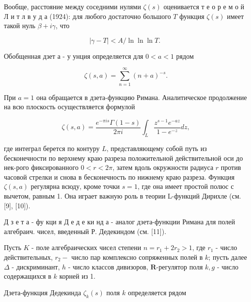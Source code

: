 \documentclass[10pt]{article}
\begin{document}
Вообще, расстояние между соседними нулями $\zeta(s)$ оценивается т е о р е м о й Л и т л в у д а (1924): для любого достаточно большого $T$ функция $\zeta(s)$ имеет такой нуль $\beta+i \gamma$, что



\[

|\gamma-T|<A / \ln \ln \ln T \text {. }

\]



Обобщенная дзет а - у унция определяется для $0<a<1$ рядом



\[

\zeta(s, a)=\sum_{n=1}^{\infty}(n+a)^{-s} .

\]



При $a=1$ она обращается в дзета-функцию Римана. Аналитическое продолжение на всю плоскость осуществляется формулой



\[

\zeta(s, a)=\frac{e^{-\pi i s} \Gamma(1-s)}{2 \pi i} \int_{L} \frac{z^{s-1} e^{-a z}}{1-e^{-z}} d z,

\]



где интеграл берется по контуру $L$, представляющему собой путь из бесконечности по верхнему краю разреза положительной действительной оси до нек-рого фиксированного $0<r<2 \pi$, затем вдоль окружности радиуса $r$ против часовой стрелки и снова в бесконечность по нижнему краю разреза. Функция $\zeta(s, a)$ регулярна всюду, кроме точки $s=1$, где она имеет простой полюс с вычетом, равным 1. Она играет важную роль в теории L-функций Дирихле (см. [9], [10]).



Д з е т а - фу кци я Д е д е ки нд а - аналог дзета-функции Римана для полей алгебраич. чисел, введенный Р. Дедекиндом (см. [11]).



Пусть $K$ - поле алгебраических чисел степени $n=r_{1}+2 r_{2}>1$, где $r_{1}$ - число действительных, $r_{2}-$ число пар комплексно сопряженных полей в $k$; пусть далее $\Delta$ - дискриминант, $h$ - число классов дивизоров, $\boldsymbol{R}$-регулятор поля $k, g$ - число содержащихся в $k$ корней из 1.



Дзета-функция Дедекинда $\zeta_{k}(s)$ поля $k$ определяется рядом
\end{document}
